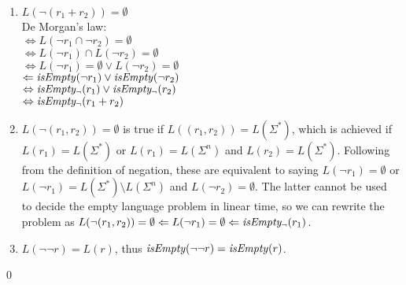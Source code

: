 \begin{lem}
\begin{enumerate}[label=\textbf{(\arabic*)}]
      \item
         $L(\neg(r_1 + r_2)) = \emptyset$ \\
         De Morgan's law: \\
         $\Leftrightarrow L(\neg r_1 \cap \neg r_2) = \emptyset$ \\
         $\Leftrightarrow L(\neg r_1) \cap L(\neg r_2) = \emptyset$ \\
         $\Leftrightarrow L(\neg r_1) = \emptyset \vee L(\neg r_2) = \emptyset$ \\
         $\Leftarrow \mathit{isEmpty}(\neg r_1) \vee \mathit{isEmpty}(\neg r_2)$ \\
         $\Leftrightarrow \mathit{isEmpty_\neg}(r_1) \vee \mathit{isEmpty_\neg}(r_2)$ \\
         $\Leftrightarrow \mathit{isEmpty_\neg}(r_1 + r_2)$

      \item
         $L(\neg(r_1, r_2)) = \emptyset$ is true if $L((r_1, r_2)) =
         L(\Sigma^*)$, which is achieved if $L(r_1) = L(\Sigma^*)$ or $L(r_1) =
         L(\Sigma^n)$ and $L(r_2)= L(\Sigma^*)$. Following from the definition
         of negation, these are equivalent to saying $L(\neg r_1) = \emptyset$
         or $L(\neg r_1) = L(\Sigma^*) \setminus L(\Sigma^n)$ and $L(\neg r_2) =
         \emptyset$. The latter cannot be used to decide the empty language
         problem in linear time, so we can rewrite the problem as $L(\neg(r_1,
         r_2)) = \emptyset \Leftarrow L(\neg r_1) = \emptyset \Leftarrow
         \mathit{isEmpty_\neg}(r_1)$.

      \item
         $L(\neg\neg r) = L(r)$, thus $\mathit{isEmpty}(\neg\neg r) = \mathit{isEmpty}(r)$.

   \end{enumerate}

   \qed
\end{lem}



